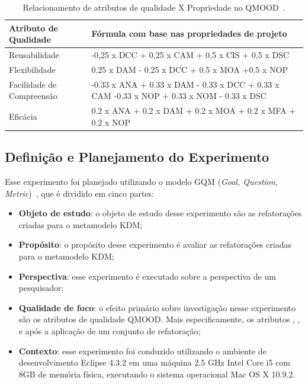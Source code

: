 \begin{table}[!h]
\caption{Relacionamento de atributos de qualidade X Propriedade no QMOOD~\cite{Bansiya_QMOOD}.}
\label{tab:QMOOD_quality_metrics2}
\begin{center}
\begin{tabular}{ | m{4cm} | m{10cm} |} 
\hline
Atributo de Qualidade & Fórmula com base nas propriedades de projeto  \\ 
\hline
Reusabilidade & -0,25 x DCC + 0,25 x CAM + 0,5 x CIS + 0,5 x DSC  \\ 
\hline
Flexibilidade & 0.25 x DAM - 0.25 x DCC + 0.5 x MOA +0.5 x NOP \\
\hline
Facilidade de Compreensão & -0.33 x ANA + 0.33 x DAM - 0.33 x DCC + 0.33 x CAM -0.33 x NOP + 0.33 x NOM - 0.33 x DSC \\ 
\hline
Eficácia & 0.2 x ANA + 0.2 x DAM + 0.2 x MOA + 0.2 x MFA + 0.2 x NOP \\ 
\hline
\end{tabular}
\end{center}
\end{table}

\subsection{Definição e Planejamento do Experimento}

Esse experimento foi planejado utilizando o modelo GQM (\textit{Goal, Question, Metric})~\cite{Wohlin}, que é dividido em cinco partes: 

\begin{itemize}
\item \textbf{Objeto de estudo}: o objeto de estudo desse experimento são as refatorações criadas para o metamodelo KDM;
\item \textbf{Propósito}: o propósito desse experimento é avaliar as refatorações criadas para o metamodelo KDM;
\item \textbf{Perspectiva}: esse experimento é executado sobre a perspectiva de um pesquisador;
\item \textbf{Qualidade de foco}: o efeito primário sobre investigação nesse experimento são os atributos de qualidade QMOOD. Mais especificamente, os atributos , ,  e  após a aplicação de um conjunto de refatoração;
\item \textbf{Contexto}: esse experimento foi conduzido utilizando o ambiente de desenvolvimento Eclipse 4.3.2 em uma máquina 2.5 GHz Intel Core i5 com 8GB de memória física, executando o sistema operacional Mac OS X 10.9.2.
\end{itemize}


